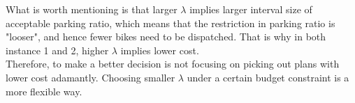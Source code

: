 \documentclass[a4paper, 12pt]{article}%
\theoremstyle{definition}
\begin{document}


\noindent What is worth mentioning is that larger $\lambda$ implies larger interval size of acceptable parking ratio, which means that the restriction in parking ratio is "looser", and hence fewer bikes need to be dispatched. That is why in both instance 1 and 2, higher $\lambda$ implies lower cost.\\ 

\noindent Therefore, to make a better decision is not focusing on picking out plans with lower cost adamantly. Choosing smaller $\lambda$ under a certain budget constraint is a more flexible way.







\end{document}

